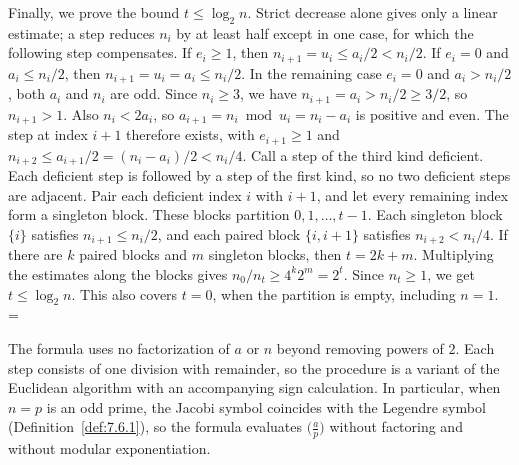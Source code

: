 \documentclass[11pt]{article}
\makeatletter
\theoremstyle{ntstyle}
\let\nt@closedisplay\]
\def\nt@guardedclose{\@ifnextchar\par{\nt@closeafterpar}{\@ifnextchar\end{\postdisplaypenalty\@M\nt@closedisplay}{\nt@closedisplay}}}
\def\nt@closeafterpar\par{\@ifnextchar\par{\nt@closeafterpar}{\@ifnextchar\end{\postdisplaypenalty\@M\nt@closedisplay\par}{\nt@closedisplay\par}}}
\renewenvironment{proof}[1][\proofname]{\par
  \pushQED{\qed}\normalfont\topsep\medskipamount\edef\nt@afterproof{\@endparpenalty=\the\@endparpenalty\relax}\@beginparpenalty\@M\@endparpenalty\@M\let\]\nt@guardedclose\trivlist\item[]\textit{#1\@addpunct{.}} \ignorespaces}{\ifvmode\addpenalty\@M\fi\popQED\nt@afterproof\endtrivlist\@endpefalse}
\newcommand{\legs}[2]{\bigl(\tfrac{#1}{#2}\bigr)}
\makeatother
\begin{document}
\begin{proof}
	Finally, we prove the bound $t\le\log_2 n$. Strict decrease alone gives
	only a linear estimate; a step reduces $n_i$ by at least half except in one
	case, for which the following step compensates. If $e_i\ge1$, then
	$n_{i+1}=u_i\le a_i/2<n_i/2$. If $e_i=0$ and $a_i\le n_i/2$, then
	$n_{i+1}=u_i=a_i\le n_i/2$. In the remaining case $e_i=0$ and
	$a_i>n_i/2$, both $a_i$ and $n_i$ are odd. Since $n_i\ge3$,
	we have $n_{i+1}=a_i>n_i/2\ge3/2$, so $n_{i+1}>1$.
	Also $n_i<2a_i$, so $a_{i+1}=n_i\bmod u_i=n_i-a_i$ is positive and even.
	The step at index $i+1$ therefore exists, with $e_{i+1}\ge1$ and
	$n_{i+2}\le a_{i+1}/2=(n_i-a_i)/2<n_i/4$.
	Call a step of the third kind deficient. Each deficient step is
	followed by a step of the first kind, so no two deficient steps are adjacent.
	Pair each deficient index $i$ with $i+1$, and let every remaining index
	form a singleton block. These blocks partition $0,1,\ldots,t-1$.
	Each singleton block $\{i\}$ satisfies $n_{i+1}\le n_i/2$, and each
	paired block $\{i,i+1\}$ satisfies $n_{i+2}<n_i/4$.
	If there are $k$ paired blocks and $m$ singleton blocks, then $t=2k+m$.
	Multiplying the estimates along the blocks gives
	$n_0/n_t\ge4^k2^m=2^t$. Since $n_t\ge1$, we get $t\le\log_2 n$.
	This also covers $t=0$, when the partition is empty, including $n=1$.
\end{proof}

The formula uses no factorization of $a$ or $n$ beyond removing
powers of $2$. Each step consists of one division with remainder,
so the procedure is a variant of the Euclidean algorithm with an
accompanying sign calculation. In
particular, when $n = p$ is an odd prime, the Jacobi symbol coincides
with the Legendre symbol (Definition~\ref{def:7.6.1}), so the formula
evaluates $\legs{a}{p}$ without factoring and without modular
exponentiation.
\end{document}
